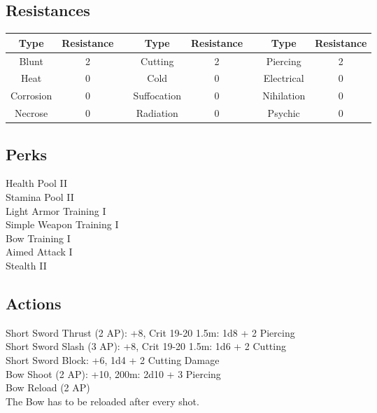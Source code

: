 \subsection{Resistances}
\begin{minipage}[H]{1\textwidth}
	\centering
	\begin{tabular}[c]{|c | c | c | c | c | c | c | c|}
		\hline
		Type & Resistance && Type & Resistance && Type & Resistance\\
		\hline
		Blunt & 2 &&
		Cutting & 2 &&
		Piercing & 2\\
		Heat & 0 &&
		Cold & 0 &&
		Electrical & 0\\
		Corrosion & 0 &&
		Suffocation & 0 &&
		Nihilation & 0 \\
		Necrose & 0 &&
		Radiation & 0 &&
		Psychic & 0\\
		\hline
	\end{tabular}
\end{minipage}

\subsection{Perks}
Health Pool II\\
Stamina Pool II\\
Light Armor Training I\\
Simple Weapon Training I\\
Bow Training I\\
Aimed Attack I\\
Stealth II\\

\subsection{Actions}
Short Sword Thrust (2 AP): +8, Crit 19-20 1.5m: 1d8 + 2 Piercing\\

Short Sword Slash (3 AP): +8, Crit 19-20 1.5m: 1d6 + 2 Cutting\\

Short Sword Block: +6, 1d4 + 2 Cutting Damage\\

Bow Shoot (2 AP): +10, 200m: 2d10 + 3 Piercing\\

Bow Reload (2 AP)\\
The Bow has to be reloaded after every shot.

